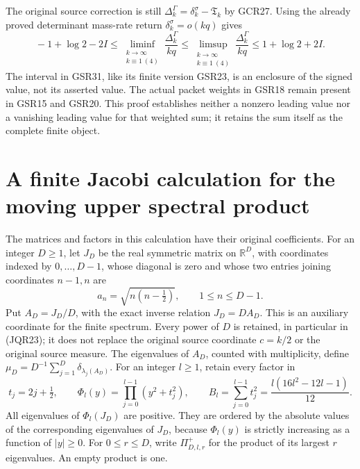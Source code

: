 \documentclass[11pt,a4paper]{article}
\begin{document}
The original source correction is still
$\Delta_k^\Gamma=\delta_k^\sigma-\mathfrak T_k$ by GCR27.
Using the already proved determinant mass-rate return
$\delta_k^\sigma=o(kq)$ gives
\[
 \boxed{\quad
 -1+\log2-2I
 \leq\liminf_{\substack{k\to\infty\\k\equiv1\ (4)}}
                       \frac{\Delta_k^\Gamma}{kq}
 \leq\limsup_{\substack{k\to\infty\\k\equiv1\ (4)}}
                       \frac{\Delta_k^\Gamma}{kq}
 \leq1+\log2+2I.
 \quad}\tag{GSR33}
\]
The interval in GSR31, like its finite version GSR23,
is an enclosure of the signed value, not its asserted value.
The actual packet weights in GSR18 remain present in GSR15
and GSR20. This proof establishes neither a nonzero leading
value nor a vanishing leading value for that weighted sum;
it retains the sum itself as the complete finite object.


\section{A finite Jacobi calculation for the moving upper spectral product}

The matrices and factors in this calculation have their original coefficients.
For an integer \(D\geq1\), let \(J_D\) be the real symmetric matrix on
\(\mathbb R^D\), with coordinates indexed by \(0,\ldots,D-1\), whose diagonal
is zero and whose two entries joining coordinates \(n-1,n\) are
\[
 a_n=\sqrt{n(n-\tfrac12)},\qquad 1\leq n\leq D-1.
 \tag{JQR1}
\]
Put \(A_D=J_D/D\), with the exact inverse relation \(J_D=D A_D\).
This is an auxiliary coordinate for the finite spectrum.  Every power of
\(D\) is retained, in particular in (JQR23); it does not replace the
original source coordinate \(c=k/2\) or the original source measure.
The eigenvalues of \(A_D\), counted with multiplicity, define
\(\mu_D=D^{-1}\sum_{j=1}^D\delta_{\lambda_j(A_D)}\).
For an integer \(l\geq1\), retain every factor in
\[
 t_j=2j+\tfrac12,\qquad
 \Phi_l(y)=\prod_{j=0}^{l-1}(y^2+t_j^2),\qquad
 B_l=\sum_{j=0}^{l-1}t_j^2
     =\frac{l(16l^2-12l-1)}{12}.
 \tag{JQR2}
\]
All eigenvalues of \(\Phi_l(J_D)\) are positive.  They are ordered by the
absolute values of the corresponding eigenvalues of \(J_D\), because
\(\Phi_l(y)\) is strictly increasing as a function of \(|y|\geq0\).
For \(0\leq r\leq D\), write \(\Pi^+_{D,l,r}\) for the product of its
largest \(r\) eigenvalues.  An empty product is one.
\end{document}

